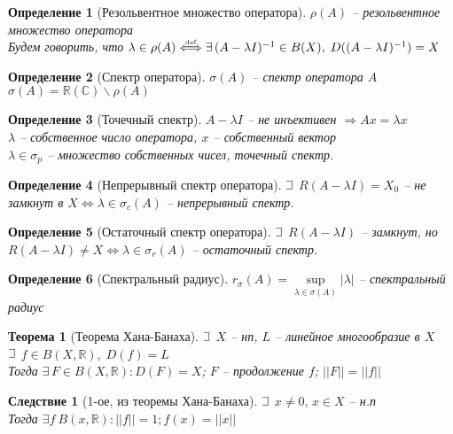 \documentclass{article}
\theoremstyle{truestyle}
\newtheorem*{defenition}{Определение}
\newtheorem*{theorem}{Теорема}
\newtheorem*{sled}{Следствие}
\def\letus{%
	\mathord{\setbox0=\hbox{$\exists$}%
		\hbox{\kern 0.125\wd0%
			\vbox to \ht0{%
				\hrule width 0.75\wd0%
				\vfill%
				\hrule width 0.75\wd0}%
			\vrule height \ht0%
			\kern 0.125\wd0}%
	}%
}
\begin{document}
\begin{defenition}[Резольвентное множество оператора]
  $\rho(A)$ -- резольвентное множество оператора\\
  Будем говорить, что $\lambda \in \rho(A) \overset{\text{\tiny def}} \Longleftrightarrow 
    \exists \, (A - \lambda I)^{-1} \in B(X), \;  D((A - \lambda I)^{-1}) = X$
\end{defenition}

\begin{defenition}[Спектр оператора]
  $\sigma(A)$ -- спектр оператора $A$ $\sigma(A) = \mathbb{R}(\mathbb{C}) \backslash \rho(A)$
\end{defenition}

\begin{defenition}[Точечный спектр]
  $A - \lambda I$ -- не инъективен $\Longrightarrow Ax = \lambda x$\\
  $\lambda$ -- собственное число оператора, $x$ -- собственный вектор\\
  $\lambda \in \sigma_p$ -- множество собственных чисел, точечный спектр.
\end{defenition}

\begin{defenition}[Непрерывный спектр оператора]
  $\letus$ $R(A - \lambda I) = X_0$ -- не замкнут в $X \Longleftrightarrow \lambda \in \sigma_c(A)$ -- непрерывный спектр.
\end{defenition}

\begin{defenition}[Остаточный спектр оператора]
  $\letus$ $R(A - \lambda I)$ -- замкнут, но $R(A - \lambda I) \ne X \Longleftrightarrow \lambda \in \sigma_r(A)$ -- остаточный спектр.
\end{defenition}

\begin{defenition}[Спектральный радиус]
	$r_{\sigma}(A) = \underset{\lambda \in \sigma(A)}{\sup} |\lambda|$ -- спектральный радиус
\end{defenition}

\begin{theorem}[Теорема Хана-Банаха]
  $\letus$ $X$ -- нп, $L$ -- линейное многообразие в  $X$\\
  $\letus$ $f \in B(X, \mathbb{R}), \; D(f) = L$\\
  Тогда $\exists \, F \in B(X, \mathbb{R}): D(F) = X$; $F$ -- продолжение $f$; $||F|| = ||f||$
\end{theorem}
    
\begin{sled}[1-ое, из теоремы Хана-Банаха]
  $\letus$ $x \ne 0, \, x \in X$ -- н.п \\
  Тогда $\exists f \ B(x, \mathbb{R}): ||f|| = 1; f(x) = ||x||$
\end{sled}
\end{document}
